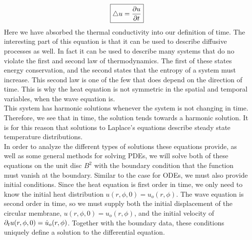 \documentclass{paper}
\begin{document}
\begin{equation}
  \boxed{
    \bigtriangleup u = \frac{\partial u}{\partial t}
  }
\end{equation}
Here we have absorbed the thermal conductivity into our definition of time. The interesting part of this equation is that it can be used to describe diffusive processes as well. In fact it can be used to describe many systems that do no violate the first and second law of thermodynamics. The first of these states energy conservation, and the second states that the entropy of a system must increase. This second law is one of the few that does depend on the direction of time. This is why the heat equation is not symmetric in the spatial and temporal variables, when the wave equation is.\\
This system has harmonic solutions whenever the system is not changing in time. Therefore, we see that in time, the solution tends towards a harmonic solution. It is for this reason that solutions to Laplace's equations describe steady state temperature distributions.\\
In order to analyze the different types of solutions these equations provide, as well as some general methods for solving PDEs, we will solve both of these equations on the unit disc $B^2$ with the boundary condition that the function must vanish at the boundary. Similar to the case for ODEs, we must also provide initial conditions. Since the heat equation is first order in time, we only need to know the initial heat distribution $u(r,\phi,0)=u_o(r,\phi)$. The wave equation is second order in time, so we must supply both the initial displacement of the circular membrane, $u(r,\phi,0)=u_o(r,\phi)$, and the initial velocity of $\partial_{t} u(r,\phi,0)=\dot{u}_o(r,\phi)$. Together with the boundary data, these conditions uniquely define a solution to the differential equation.
\end{document}
